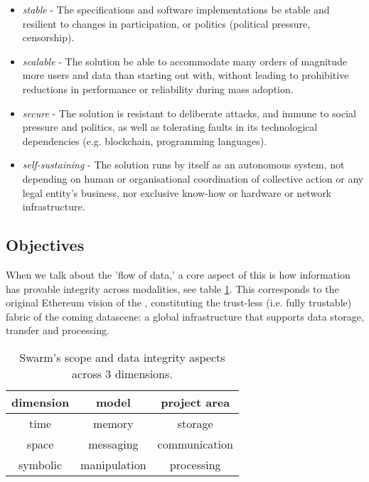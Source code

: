 \begin{itemize}
\item \emph{stable} - The specifications and software implementations be stable and resilient to changes in participation, or politics (political pressure, censorship).
\item \emph{scalable} - The solution be able to accommodate many orders of magnitude more users and data than starting out with, without leading to prohibitive reductions in performance or reliability during mass adoption.  
\item \emph{secure} - The solution is resistant to deliberate attacks, and immune to social pressure and politics, as well as tolerating faults in its technological dependencies (e.g. blockchain, programming languages). 
\item \emph{self-sustaining} - The solution runs by itself as an autonomous system, not depending on human or organisational coordination of collective action or any legal entity's business, nor exclusive know-how or hardware or network infrastructure. 
\end{itemize}




\subsection{Objectives \statusyellow}\label{sec:objectives}


When we talk about the 'flow of data,' a core aspect of this is how information has provable integrity across modalities, see table \ref{tab:scope}. This corresponds to the original Ethereum vision of the ,  constituting the trust-less (i.e. fully trustable) fabric of the coming datascene: a global infrastructure that supports data storage, transfer and processing.

\begin{table}[htb]
\centering
\begin{tabular}{c|c|c}
dimension & model & project area\\\hline
%
time & memory & storage \\
space & messaging & communication \\
symbolic & manipulation & processing \\
\end{tabular}
\caption{Swarm's scope and data integrity aspects across 3 dimensions.}
\label{tab:scope}
\end{table}

